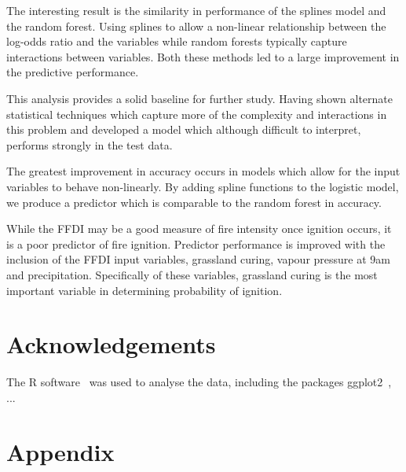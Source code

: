 \documentclass[11pt,a4paper]{article}
\begin{document}
The interesting result is the similarity in performance of the splines model and the random forest. Using splines to allow a non-linear relationship between the log-odds ratio and the variables while random forests typically capture interactions between variables. Both these methods led to a large improvement in the predictive performance.

This analysis provides a solid baseline for further study. Having shown alternate statistical techniques which capture more of the complexity and interactions in this problem and developed a model which although difficult to interpret, performs strongly in the test data.


The greatest improvement in accuracy occurs in models which allow for the input variables to behave non-linearly. By adding spline functions to the logistic model, we produce a predictor which is comparable to the random forest in accuracy.

While the FFDI may be a good measure of fire intensity once ignition occurs, it is a poor predictor of fire ignition. Predictor performance is improved with the inclusion of the FFDI input variables, grassland curing, vapour pressure at 9am and precipitation. Specifically of these variables, grassland curing is the most important variable in determining probability of ignition.

\section*{Acknowledgements}

The R software~\citep{CRAN} was used to analyse the data, including the packages ggplot2~\citep{ggplot2}, ...





\section*{Appendix}
\end{document}
